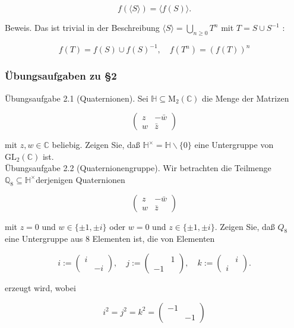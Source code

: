 \documentclass[10pt, letterpaper]{article}
\begin{document}
$$
f(\langle S\rangle)=\langle f(S)\rangle .
$$

Beweis. Das ist trivial in der Beschreibung $\langle S\rangle=\bigcup_{n \geq 0} T^{n}$ mit $T=S \cup S^{-1}$ :

$$
f(T)=f(S) \cup f(S)^{-1}, \quad f\left(T^{n}\right)=(f(T))^{n}
$$


\subsubsection{Übungsaufgaben zu §2}


Übungsaufgabe 2.1 (Quaternionen). Sei $\mathbb{H} \subseteq \mathrm{M}_{2}(\mathbb{C})$ die Menge der Matrizen

$$
\left(\begin{array}{cc}
z & -\bar{w} \\
w & \bar{z}
\end{array}\right)
$$

mit $z, w \in \mathbb{C}$ beliebig. Zeigen Sie, daß $\mathbb{H}^{\times}=\mathbb{H} \backslash\{0\}$ eine Untergruppe von $\mathrm{GL}_{2}(\mathbb{C})$ ist.\\
Übungsaufgabe 2.2 (Quaternionengruppe). Wir betrachten die Teilmenge $\mathbb{Q}_{8} \subseteq \mathbb{H}^{\times}$derjenigen Quaternionen

$$
\left(\begin{array}{cc}
z & -\bar{w} \\
w & \bar{z}
\end{array}\right)
$$

mit $z=0$ und $w \in\{ \pm 1, \pm i\}$ oder $w=0$ und $z \in\{ \pm 1, \pm i\}$. Zeigen Sie, daß $Q_{8}$ eine Untergruppe aus 8 Elementen ist, die von Elementen

$$
i:=\left(\begin{array}{cc}
i & \\
& -i
\end{array}\right), \quad j:=\left(\begin{array}{ll} 
& 1 \\
-1 &
\end{array}\right), \quad k:=\left(\begin{array}{ll} 
& i \\
i &
\end{array}\right) .
$$

erzeugt wird, wobei

$$
i^{2}=j^{2}=k^{2}=\left(\begin{array}{ll}
-1 & \\
& -1
\end{array}\right)
$$
\end{document}
